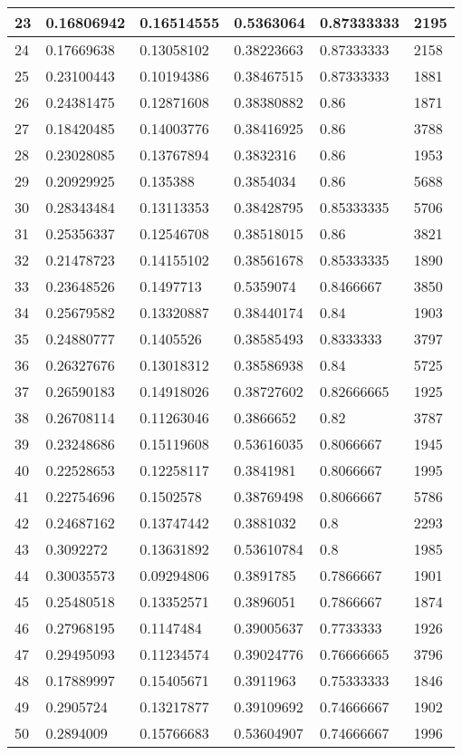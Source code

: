 \begin{longtable}{|l|l|l|l|l|l|}
23 & 0.16806942 & 0.16514555 & 0.5363064 & 0.87333333 & 2195 \\ \hline 
24 & 0.17669638 & 0.13058102 & 0.38223663 & 0.87333333 & 2158 \\ \hline 
25 & 0.23100443 & 0.10194386 & 0.38467515 & 0.87333333 & 1881 \\ \hline 
26 & 0.24381475 & 0.12871608 & 0.38380882 & 0.86 & 1871 \\ \hline 
27 & 0.18420485 & 0.14003776 & 0.38416925 & 0.86 & 3788 \\ \hline 
28 & 0.23028085 & 0.13767894 & 0.3832316 & 0.86 & 1953 \\ \hline 
29 & 0.20929925 & 0.135388 & 0.3854034 & 0.86 & 5688 \\ \hline 
30 & 0.28343484 & 0.13113353 & 0.38428795 & 0.85333335 & 5706 \\ \hline 
31 & 0.25356337 & 0.12546708 & 0.38518015 & 0.86 & 3821 \\ \hline 
32 & 0.21478723 & 0.14155102 & 0.38561678 & 0.85333335 & 1890 \\ \hline 
33 & 0.23648526 & 0.1497713 & 0.5359074 & 0.8466667 & 3850 \\ \hline 
34 & 0.25679582 & 0.13320887 & 0.38440174 & 0.84 & 1903 \\ \hline 
35 & 0.24880777 & 0.1405526 & 0.38585493 & 0.8333333 & 3797 \\ \hline 
36 & 0.26327676 & 0.13018312 & 0.38586938 & 0.84 & 5725 \\ \hline 
37 & 0.26590183 & 0.14918026 & 0.38727602 & 0.82666665 & 1925 \\ \hline 
38 & 0.26708114 & 0.11263046 & 0.3866652 & 0.82 & 3787 \\ \hline 
39 & 0.23248686 & 0.15119608 & 0.53616035 & 0.8066667 & 1945 \\ \hline 
40 & 0.22528653 & 0.12258117 & 0.3841981 & 0.8066667 & 1995 \\ \hline 
41 & 0.22754696 & 0.1502578 & 0.38769498 & 0.8066667 & 5786 \\ \hline 
42 & 0.24687162 & 0.13747442 & 0.3881032 & 0.8 & 2293 \\ \hline 
43 & 0.3092272 & 0.13631892 & 0.53610784 & 0.8 & 1985 \\ \hline 
44 & 0.30035573 & 0.09294806 & 0.3891785 & 0.7866667 & 1901 \\ \hline 
45 & 0.25480518 & 0.13352571 & 0.3896051 & 0.7866667 & 1874 \\ \hline 
46 & 0.27968195 & 0.1147484 & 0.39005637 & 0.7733333 & 1926 \\ \hline 
47 & 0.29495093 & 0.11234574 & 0.39024776 & 0.76666665 & 3796 \\ \hline 
48 & 0.17889997 & 0.15405671 & 0.3911963 & 0.75333333 & 1846 \\ \hline 
49 & 0.2905724 & 0.13217877 & 0.39109692 & 0.74666667 & 1902 \\ \hline 
50 & 0.2894009 & 0.15766683 & 0.53604907 & 0.74666667 & 1996 \\ \hline 
\end{longtable}